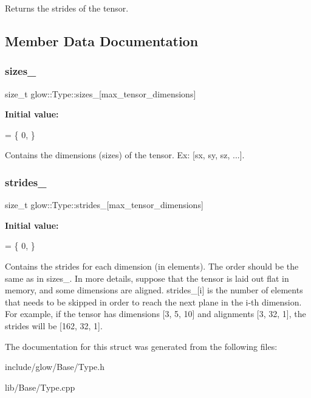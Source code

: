 \begin{DoxyReturn}{Returns}
the strides of the tensor. 
\end{DoxyReturn}


\subsection{Member Data Documentation}
\mbox{\label{structglow_1_1_type_a7725158c5337a8e6787a090c9a403cc1}} 
\subsubsection{\texorpdfstring{sizes\+\_\+}{sizes\_}}
{\footnotesize\ttfamily size\+\_\+t glow\+::\+Type\+::sizes\+\_\+\mbox{[}max\+\_\+tensor\+\_\+dimensions\mbox{]}}

{\bfseries Initial value\+:}
\begin{DoxyCode}
= \{
      0,
  \}
\end{DoxyCode}


Contains the dimensions (sizes) of the tensor. Ex\+: \mbox{[}sx, sy, sz, ...\mbox{]}. 

\mbox{\label{structglow_1_1_type_ab1f4da2b41f26f88cc94db137d1a1cac}} 
\subsubsection{\texorpdfstring{strides\+\_\+}{strides\_}}
{\footnotesize\ttfamily size\+\_\+t glow\+::\+Type\+::strides\+\_\+\mbox{[}max\+\_\+tensor\+\_\+dimensions\mbox{]}}

{\bfseries Initial value\+:}
\begin{DoxyCode}
= \{
      0,
  \}
\end{DoxyCode}
Contains the strides for each dimension (in elements). The order should be the same as in sizes\+\_\+. In more details, suppose that the tensor is laid out flat in memory, and some dimensions are aligned. strides\+\_\+\mbox{[}i\mbox{]} is the number of elements that needs to be skipped in order to reach the next plane in the i-\/th dimension. For example, if the tensor has dimensions \mbox{[}3, 5, 10\mbox{]} and alignments \mbox{[}3, 32, 1\mbox{]}, the strides will be \mbox{[}162, 32, 1\mbox{]}. 

The documentation for this struct was generated from the following files\+:\begin{DoxyCompactItemize}
\item 
include/glow/\+Base/Type.\+h\item 
lib/\+Base/Type.\+cpp\end{DoxyCompactItemize}
